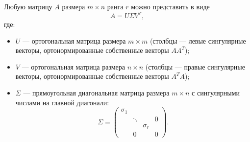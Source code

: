 \documentclass[10pt]{article}
\begin{document}
\begin{theorem}
    Любую матрицу $A$ размера $m\times n$ ранга $r$ можно представить в виде
    \[
    A = U \Sigma V^T,
    \]
    где:
    \begin{itemize}
        \item $U$ --- ортогональная матрица размера $m\times m$ (столбцы --- левые сингулярные векторы, ортонормированные собственные векторы $AA^T$);
        \item $V$ --- ортогональная матрица размера $n\times n$ (столбцы --- правые сингулярные векторы, ортонормированные собственные векторы $A^TA$);
        \item $\Sigma$ --- прямоугольная диагональная матрица размера $m\times n$ с сингулярными числами на главной диагонали:
        \[
        \Sigma = \begin{pmatrix}
        \sigma_1 & & & \\
        & \ddots & & 0 \\
        & & \sigma_r & \\
        & 0 & & 0
        \end{pmatrix}.
        \]
    \end{itemize}
\end{theorem}
\end{document}

